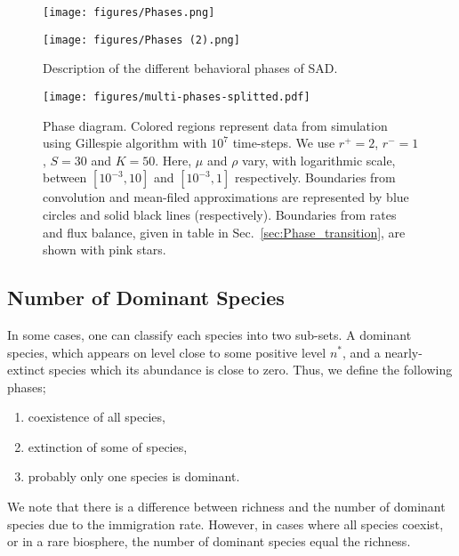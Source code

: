 \documentclass[%
 amsmath,amssymb,
 reprint,%
]{revtex4-2}
\begin{document}
\begin{figure}
    \centering
    \texttt{[image: figures/Phases.png]}
    
    \hspace{1cm}
    \texttt{[image: figures/Phases (2).png]}
    \caption{Description of the different behavioral phases of SAD.}
    \label{fig:phases}
\end{figure}


\begin{figure}
    \centering
    \texttt{[image: figures/multi-phases-splitted.pdf]}
    \caption{Phase diagram.  Colored regions represent data from simulation using Gillespie algorithm with $10^7$ time-steps. We use $r^+=2$, $r^-=1$, $S=30$ and $K=50$. Here, $\mu$ and $\rho$ vary, with logarithmic scale, between $[10^{-3}, 10]$ and $[10^{-3}, 1]$ respectively.  Boundaries from convolution and mean-filed approximations are represented by blue circles and solid black lines (respectively). Boundaries from rates and flux balance, given in table in Sec.~\ref{sec:Phase_transition}, are shown with pink stars. }
    \label{fig:phases_sim}
\end{figure}

\subsection{Number of Dominant Species}
In some cases, one can classify each species into two sub-sets. A dominant species, which appears on level close to some positive level $n^*$, and a nearly-extinct species which its abundance is close to zero.  Thus, we define the following phases;
\begin{enumerate}[label=(\roman*)]
    \item coexistence of all species,
    \item extinction of some of species,
    \item probably only one species is dominant. 
\end{enumerate}
We note that there is a difference between richness and the number of dominant species due to the immigration rate. However, in cases where all species coexist, or in a rare biosphere, the number of dominant species equal the richness. 

\end{document}

